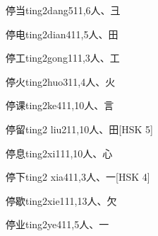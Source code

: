 \begin{EntryWithPhonetic}{停当}{ting2dang5}{11,6}{⼈、⼹}
\end{EntryWithPhonetic}

\begin{EntryWithPhonetic}{停电}{ting2dian4}{11,5}{⼈、⽥}
\end{EntryWithPhonetic}

\begin{EntryWithPhonetic}{停工}{ting2gong1}{11,3}{⼈、⼯}
\end{EntryWithPhonetic}

\begin{EntryWithPhonetic}{停火}{ting2huo3}{11,4}{⼈、⽕}
\end{EntryWithPhonetic}

\begin{EntryWithPhonetic}{停课}{ting2ke4}{11,10}{⼈、⾔}
\end{EntryWithPhonetic}

\begin{EntryWithPhonetic}{停留}{ting2 liu2}{11,10}{⼈、⽥}[HSK 5]
\end{EntryWithPhonetic}

\begin{EntryWithPhonetic}{停息}{ting2xi1}{11,10}{⼈、⼼}
\end{EntryWithPhonetic}

\begin{EntryWithPhonetic}{停下}{ting2 xia4}{11,3}{⼈、⼀}[HSK 4]
\end{EntryWithPhonetic}

\begin{EntryWithPhonetic}{停歇}{ting2xie1}{11,13}{⼈、⽋}
\end{EntryWithPhonetic}

\begin{EntryWithPhonetic}{停业}{ting2ye4}{11,5}{⼈、⼀}
\end{EntryWithPhonetic}


